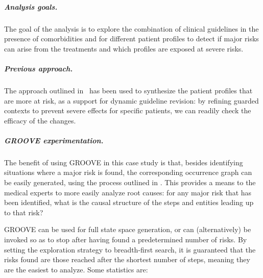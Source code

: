 \subparagraph*{Analysis goals.}
The goal of the analysis is to explore the combination of clinical guidelines in the presence of comorbidities and for different patient profiles to detect if major risks can arise from the treatments and which profiles are exposed at severe risks.

\subparagraph*{Previous approach.}
The approach outlined in~\cite{DBLP:conf/cmsb/BowlesBBFGM24} has been used to synthesize the patient profiles that are more at risk, as a support for dynamic guideline revision: by refining guarded contexts to prevent severe effects for specific patients, we can readily check the efficacy of the changes.

\subparagraph*{GROOVE experimentation.}

The benefit of using GROOVE in this case study is that, besides identifying situations where a major risk is found, the corresponding occurrence graph can be easily generated, using the process outlined in . This provides a means to the medical experts to more easily analyze root causes: for any major risk that has been identified, what is the causal structure of the steps and entities leading up to that risk?

GROOVE can be used for full state space generation, or can (alternatively) be invoked so as to stop after having found a predetermined number of risks. By setting the exploration strategy to breadth-first search, it is guaranteed that the risks found are those reached after the shortest number of steps, meaning they are the easiest to analyze. Some statistics are:





